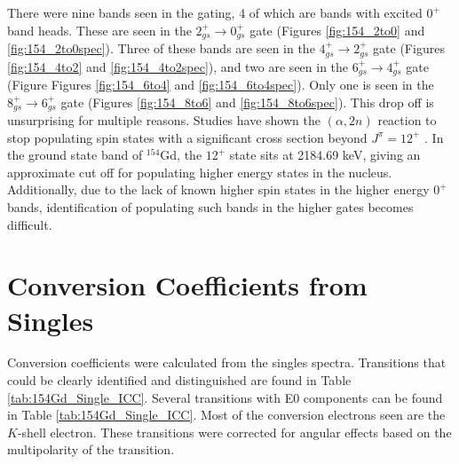 \afterpage{\clearpage}

There were nine bands seen in the gating, 4 of which are bands with excited $0^+$ band heads. These are seen in the $2^+_{gs}\rightarrow 0^+_{gs}$ gate (Figures \ref{fig:154_2to0} and \ref{fig:154_2to0spec}). Three of these bands are seen in the $4^+_{gs}\rightarrow 2^+_{gs}$ gate (Figures \ref{fig:154_4to2} and \ref{fig:154_4to2spec}), and two are seen in the $6^+_{gs}\rightarrow 4^+_{gs}$ gate (Figure Figures \ref{fig:154_6to4} and \ref{fig:154_6to4spec}). Only one is seen in the $8^+_{gs}\rightarrow 6^+_{gs}$ gate (Figures \ref{fig:154_8to6} and \ref{fig:154_8to6spec}). This drop off is unsurprising for multiple reasons. Studies have shown the $(\alpha,2n)$ reaction to stop populating spin states with a significant cross section beyond $J^{\pi}=12^+$ \citep{wu93:_a2n}. In the ground state band of $^{154}$Gd, the $12^+$ state sits at 2184.69 keV, giving an approximate cut off for populating higher energy states in the nucleus. Additionally, due to the lack of known higher spin states in the higher energy $0^+$ bands, identification of populating such bands in the higher gates becomes difficult.

\afterpage{\clearpage}

\afterpage{\clearpage}

\afterpage{\clearpage}

\afterpage{\clearpage}

\section{Conversion Coefficients from Singles}
\label{sec:154_Conv_Singles}

Conversion coefficients were calculated from the singles spectra. Transitions that could be clearly identified and distinguished are found in Table \ref{tab:154Gd_Single_ICC}. Several transitions with E0 components can be found in Table \ref{tab:154Gd_Single_ICC}. Most of the conversion electrons seen are the $K$-shell electron. These transitions were corrected for angular effects based on the multipolarity of the transition.

